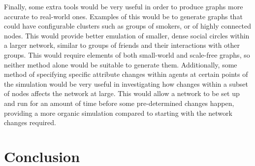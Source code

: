\documentclass[]{report}
\begin{document}
Finally, some extra tools would be very useful in order to produce graphs more accurate to real-world ones. Examples of this would be to generate graphs that could have configurable clusters such as groups of smokers, or of highly connected nodes. This would provide better emulation of smaller, dense social circles within a larger network, similar to groups of friends and their interactions with other groups. This would require elements of both small-world and scale-free graphs, so neither method alone would be suitable to generate them. Additionally, some method of specifying specific attribute changes within agents at certain points of the simulation would be very useful in investigating how changes within a subset of nodes affects the network at large. This would allow a network to be set up and run for an amount of time before some pre-determined changes happen, providing a more organic simulation compared to starting with the network changes required.


%
%

%
%
\chapter{Conclusion}
%
%


\end{document}
